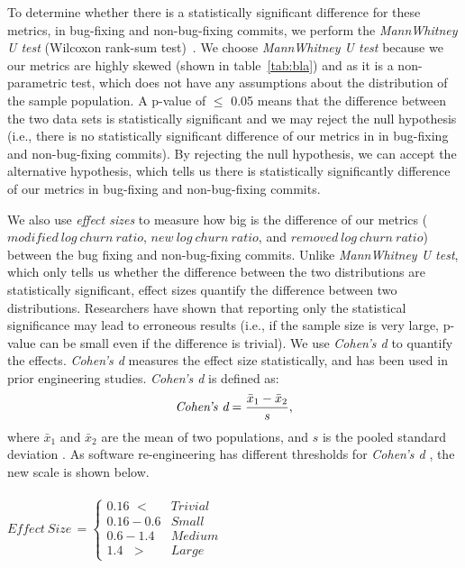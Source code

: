 To determine whether there is a statistically significant difference for these metrics, in bug-fixing and non-bug-fixing commits, we perform the \textsl{MannWhitney U test} (Wilcoxon rank-sum test)~\cite{gehan1965generalized}. We choose {\em MannWhitney U test} because we our metrics are highly skewed (shown in table~\ref{tab:bla}) and as it is a non-parametric test, which does not have any assumptions about the distribution of the sample population. A p-value of \ensuremath{\le} 0.05 means that the difference between the two data sets is statistically significant and we may reject the null hypothesis (i.e., there is no statistically significant difference of our metrics in in bug-fixing and non-bug-fixing commits). By rejecting the null hypothesis, we can accept the alternative hypothesis, which tells us there is statistically significantly difference of our metrics in bug-fixing and non-bug-fixing commits.


We also use {\em effect sizes} to measure how big is the difference of our metrics ($modified\ log\ churn\ ratio$, $new\ log\ churn\ ratio$, and $removed\ log\ churn\ ratio$) between the bug fixing and non-bug-fixing commits. Unlike {\em MannWhitney U test}, which only tells us whether the difference between the two distributions are statistically significant, effect sizes quantify the difference between two distributions. Researchers have shown that reporting only the statistical significance may lead to erroneous results  (i.e., if the sample size is very large, p-value can be small even if the difference is trivial). We use {\em Cohen's d} to quantify the effects. {\em Cohen's d} measures the effect size statistically, and has been used in prior engineering studies. {\em Cohen's d} is defined as:
\begin{equation} \text{{\em Cohen's d}} = \frac{\bar{x}_1 - \bar{x}_2}{s},
\label{eq:cohensd}
\end{equation}
where $\bar{x}_1$ and $\bar{x}_2$ are the mean of two populations, and $s$ is the pooled standard deviation \cite{HartungBook2011}. As software re-engineering has different thresholds for 
{\em Cohen's d} \cite{Effectsize}, the new scale is shown below. \\ \\
$Effect\: Size\,=\begin{cases}
0.16\,\,< & Trivial\\
0.16-0.6 & Small\\
0.6-1.4 & Medium\\
1.4\;\,\,> & Large
\end{cases}$

